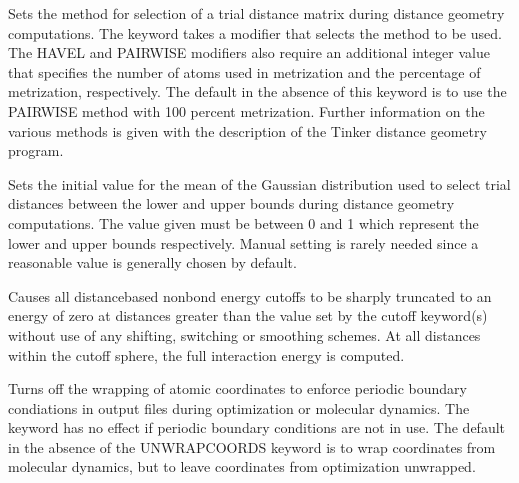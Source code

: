 \documentclass[letterpaper,11pt,english]{sphinxmanual}
\begin{document}
\ignorespaces {}\label{\detokenize{text/keywords:key-trial-distance}}\begin{description}
\sphinxAtStartPar
Sets the method for selection of a trial distance matrix during distance geometry computations. The keyword takes a modifier that selects the method to be used. The HAVEL and PAIRWISE modifiers also require an additional integer value that specifies the number of atoms used in metrization and the percentage of metrization, respectively. The default in the absence of this keyword is to use the PAIRWISE method with 100 percent metrization. Further information on the various methods is given with the description of the Tinker distance geometry program.

\end{description}

\ignorespaces {}\label{\detokenize{text/keywords:key-trial-distribution}}\begin{description}
\sphinxAtStartPar
Sets the initial value for the mean of the Gaussian distribution used to select trial distances between the lower and upper bounds during distance geometry computations. The value given must be between 0 and 1 which represent the lower and upper bounds respectively. Manual setting is rarely needed since a reasonable value is generally chosen by default.

\end{description}

\ignorespaces {}\label{\detokenize{text/keywords:key-truncate}}\begin{description}
\sphinxAtStartPar
Causes all distance\sphinxhyphen{}based nonbond energy cutoffs to be sharply truncated to an energy of zero at distances greater than the value set by the cutoff keyword(s) without use of any shifting, switching or smoothing schemes. At all distances within the cutoff sphere, the full interaction energy is computed.

\end{description}

\ignorespaces {}\label{\detokenize{text/keywords:unwrap-coords}}\begin{description}
\sphinxAtStartPar
Turns off the wrapping of atomic coordinates to enforce periodic boundary condiations in output files during optimization or molecular dynamics. The keyword has no effect if periodic boundary conditions are not in use. The default in the absence of the UNWRAP\sphinxhyphen{}COORDS keyword is to wrap coordinates from molecular dynamics, but to leave coordinates from optimization unwrapped.

\end{description}
\end{document}
